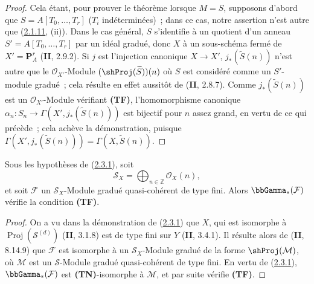 \begin{proof}
Cela étant, pour prouver le théorème lorsque $M=S$, supposons d'abord que
$S=A[T_0,\ldots,T_r]$ ($T_i$ indéterminées)~; dans ce cas, notre assertion
n'est autre que (\hyperref[III.2.1.11-fr]{2.1.11}, (ii)). Dans le cas
général, $S$ s'identifie à un quotient d'un anneau
$S'=A[T_0,\ldots,T_r]$ par un idéal gradué, donc $X$ à un sous-schéma
fermé de $X'=\mathbf P_A^r$ (\textbf{II}, 2.9.2). Si $j$ est l'injection canonique
$X\to X'$, $j_*(\widetilde S(n))$ n'est autre que le
$\mathcal O_{X'}$-Module $(\shProj(\widetilde S))(n)$ où $S$ est considéré
comme un $S'$-module gradué~; cela résulte en effet aussitôt de
(\textbf{II}, 2.8.7). Comme $j_*(\widetilde S(n))$ est un
$\mathcal O_{X'}$-Module vérifiant \textbf{(TF)}, l'homomorphisme canonique
$\alpha_n:S_n\to\Gamma(X',j_*(\widetilde S(n)))$ est bijectif pour $n$
assez grand, en vertu de ce qui précède~; cela achève la démonstration,
puisque
$\Gamma(X',j_*(\widetilde S(n)))=\Gamma(X,\widetilde S(n))$.
\end{proof}

\begin{corollary}[2.3.2]
\label{III.2.3.2-fr}
Sous les hypothèses de \textup{(\hyperref[III.2.3.1-fr]{2.3.1})}, soit
\[
\mathcal S_X=\bigoplus_{n\in\mathbb Z}\mathcal O_X(n),
\]
et soit $\mathcal F$ un $\mathcal S_X$-Module gradué quasi-cohérent de
type fini. Alors $\bbGamma_*(\mathcal F)$ vérifie la condition
\textup{\textbf{(TF)}}.
\end{corollary}

\begin{proof}
On a vu dans la démonstration de
(\hyperref[III.2.3.1-fr]{2.3.1}) que $X$, qui est isomorphe à
$\operatorname{Proj}(\mathcal S^{(d)})$ (\textbf{II}, 3.1.8) est de type fini sur
$Y$ (\textbf{II}, 3.4.1). Il résulte alors de (\textbf{II}, 8.14.9) que $\mathcal F$ est
isomorphe à un $\mathcal S_X$-Module gradué de la forme
$\shProj(\mathcal M)$, où $\mathcal M$ est un $\mathcal S$-Module gradué
quasi-cohérent de type fini. En vertu de
(\hyperref[III.2.3.1-fr]{2.3.1}), $\bbGamma_*(\mathcal F)$ est
\textbf{(TN)}-isomorphe à $\mathcal M$, et par suite vérifie
\textbf{(TF)}.
\end{proof}

